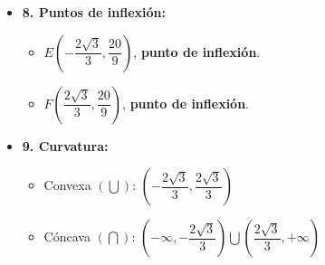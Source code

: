 \begin{itemize}
	\item \textbf{8. Puntos de inflexión:}\\
	\begin{itemize}
		\item $E(-\dfrac{2\sqrt{3}}{3}, \dfrac{20}{9})$, \textbf{punto de inflexión}.
		\item $F(\dfrac{2\sqrt{3}}{3}, \dfrac{20}{9})$, \textbf{punto de inflexión}.
	\end{itemize}
	\item \textbf{9. Curvatura:}\\
	\begin{itemize}
		\item Convexa $(\bigcup)$: $(-\dfrac{2\sqrt{3}}{3}, \dfrac{2\sqrt{3}}{3})$
		\item Cóncava $(\bigcap)$: $(-\infty, -\dfrac{2\sqrt{3}}{3}) \bigcup ( \dfrac{2\sqrt{3}}{3}, +\infty)$
	\end{itemize}
\end{itemize}
